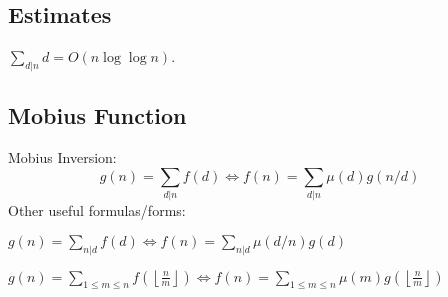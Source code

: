 \subsection{Estimates}
	$\sum_{d|n} d = O(n \log \log n)$.


\subsection{Mobius Function}
  Mobius Inversion:
  \[ g(n) = \sum_{d|n} f(d) \Leftrightarrow f(n) = \sum_{d|n} \mu(d)g(n/d) \]
  Other useful formulas/forms:


  $ g(n) = \sum_{n|d} f(d) \Leftrightarrow f(n) = \sum_{n|d} \mu(d/n)g(d)$

 $ g(n) = \sum_{1 \leq m \leq n} f(\left\lfloor\frac{n}{m}\right \rfloor ) \Leftrightarrow f(n) = \sum_{1\leq m\leq n} \mu(m)g(\left\lfloor\frac{n}{m}\right\rfloor)$
